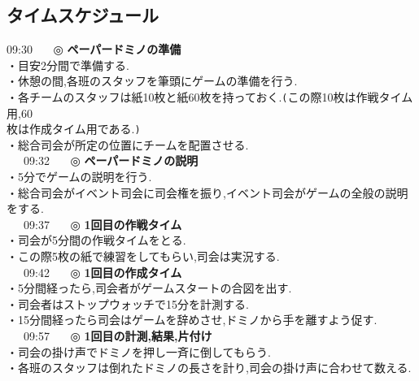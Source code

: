 \subsection{タイムスケジュール}
09:30 \ \ \ ◎ \textbf{ペーパードミノの準備}\\
\hspace{15mm}・目安2分間で準備する.\\
\hspace{15mm}・休憩の間,各班のスタッフを筆頭にゲームの準備を行う.\\
\hspace{15mm}・各チームのスタッフは紙10枚と紙60枚を持っておく.\verb+(+この際10枚は作戦タイム用,60\\
\hspace{15mm}枚は作成タイム用である.\verb+)+\\
\hspace{15mm}・総合司会が所定の位置にチームを配置させる.\\
\ \ \ 09:32 \ \ \ ◎ \textbf{ペーパードミノの説明}\\
\hspace{15mm}・5分でゲームの説明を行う.\\
\hspace{15mm}・総合司会がイベント司会に司会権を振り,イベント司会がゲームの全般の説明をする.\\
\ \ \ 09:37 \ \ \ ◎ \textbf{1回目の作戦タイム}\\
\hspace{15mm}・司会が5分間の作戦タイムをとる.\\
\hspace{15mm}・この際5枚の紙で練習をしてもらい,司会は実況する.\\
\ \ \ 09:42 \ \ \ ◎ \textbf{1回目の作成タイム}\\
\hspace{15mm}・5分間経ったら,司会者がゲームスタートの合図を出す.\\
\hspace{15mm}・司会者はストップウォッチで15分を計測する.\\
\hspace{15mm}・15分間経ったら司会はゲームを辞めさせ,ドミノから手を離すよう促す.\\
\ \ \ 09:57 \ \ \ ◎ \textbf{1回目の計測,結果,片付け}\\
\hspace{15mm}・司会の掛け声でドミノを押し一斉に倒してもらう.\\
\hspace{15mm}・各班のスタッフは倒れたドミノの長さを計り,司会の掛け声に合わせて数える.\\
